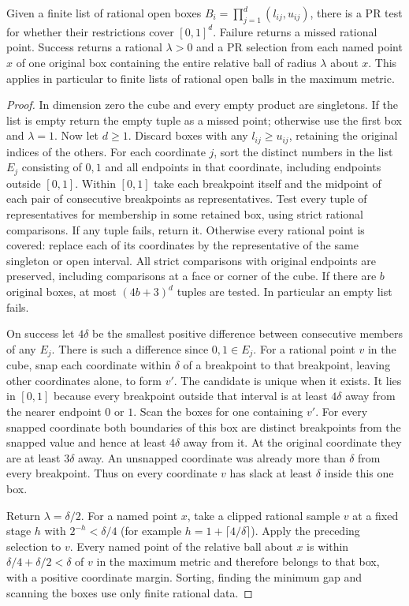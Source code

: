 \begin{proposition}\label{idx-metric198}
\label{prop:boxcover}
Given a finite list of rational open boxes $B_i=\prod_{j=1}^{d}(l_{ij},u_{ij})$,
there is a PR test for whether their restrictions cover $[0,1]^d$. Failure
returns a missed rational point. Success returns a rational $\lambda>0$
and a PR selection from each named point $x$ of one original box containing
the entire relative ball of radius $\lambda$ about $x$. This applies in
particular to finite lists of rational open balls in the maximum metric.
\end{proposition}
\begin{proof}
In dimension zero the cube and every empty product are singletons.
If the list is empty return the empty tuple as a missed point; otherwise
use the first box and $\lambda=1$. Now let $d\ge1$. Discard boxes with
any $l_{ij}\ge u_{ij}$, retaining the original indices of the others.
For each coordinate $j$, sort the distinct numbers in the list $E_j$
consisting of $0,1$ and all endpoints in that coordinate, including
endpoints outside $[0,1]$. Within $[0,1]$ take each breakpoint itself
and the midpoint of each pair of consecutive breakpoints as representatives.
Test every tuple of representatives for membership in some retained box,
using strict rational comparisons. If any tuple fails, return it.
Otherwise every rational point is covered: replace each of its coordinates
by the representative of the same singleton or open interval. All strict
comparisons with original endpoints are preserved, including comparisons
at a face or corner of the cube. If there are $b$ original boxes, at most
$(4b+3)^d$ tuples are tested. In particular an empty list fails.

On success let $4\delta$ be the smallest positive difference between
consecutive members of any $E_j$. There is such a difference since
$0,1\in E_j$. For a rational point $v$ in the cube, snap each coordinate
within $\delta$ of a breakpoint to that breakpoint, leaving other
coordinates alone, to form $v'$. The candidate is unique when it exists.
It lies in $[0,1]$ because every breakpoint outside that interval is at
least $4\delta$ away from the nearer endpoint $0$ or $1$. Scan the boxes
for one containing $v'$. For every snapped coordinate both boundaries of
this box are distinct breakpoints from the snapped value and hence at least
$4\delta$ away from it. At the original coordinate they are at least
$3\delta$ away. An unsnapped coordinate was already more than $\delta$
from every breakpoint. Thus on every coordinate $v$ has slack at least
$\delta$ inside this one box.

Return $\lambda=\delta/2$. For a named point $x$, take a clipped rational
sample $v$ at a fixed stage $h$ with $2^{-h}<\delta/4$ (for example
$h=1+\lceil4/\delta\rceil$). Apply the preceding selection to $v$.
Every named point of the relative ball about $x$ is within
$\delta/4+\delta/2<\delta$ of $v$ in the maximum metric and therefore
belongs to that box, with a positive coordinate margin. Sorting, finding
the minimum gap and scanning the boxes use only finite rational data.
\end{proof}

